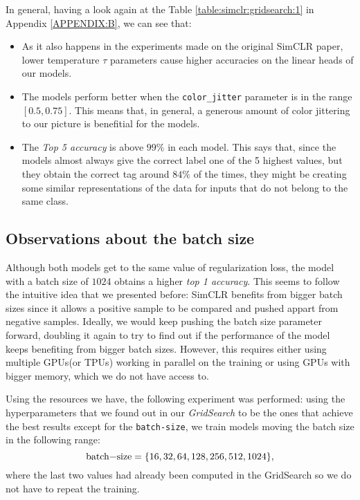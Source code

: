 In general, having a look again at the Table \ref{table:simclr:gridsearch:1} in Appendix \ref{APPENDIX:B},  we can see that:

\begin{itemize}
    \item As it also happens in the experiments made on the original SimCLR paper, lower temperature $\tau$ parameters cause higher accuracies on the linear heads of our models.
    
    \item The models perform better when the \lstinline{color_jitter} parameter is in the range $[0.5,0.75]$. This means that, in general, a generous amount of color jittering to our picture is benefitial for the models.

    \item The \emph{Top 5 accuracy} is above $99\%$ in each model. This says that, since the models almost always give the correct label one of the 5 highest values, but they obtain the correct tag around $84\%$ of the times, they might be creating some similar representations of the data for inputs that do not belong to the same class. 
\end{itemize}

\subsection*{Observations about the batch size}

Although both models get to the same value of regularization loss, the model with a batch size of $1024$ obtains a higher \emph{top 1 accuracy}. This seems to follow the intuitive idea that we presented before: SimCLR benefits from bigger batch sizes since it allows a positive sample to be compared and pushed appart from negative samples. Ideally, we would keep pushing the batch size parameter forward, doubling it again to try to find out if the performance of the model keeps benefiting from bigger batch sizes. However, this requires either using multiple GPUs(or TPUs) working in parallel on the training or using GPUs with bigger memory, which we do not have access to. 

Using the resources we have, the following experiment was performed: using the hyperparameters that we found out in our \emph{GridSearch} to be the ones that achieve the best results except for the \lstinline{batch-size}, we train models moving the batch size in the following range: 
$$
\text{\lstinline{batch-size}}=\{16,32,64,128,256,512,1024\},
$$
where the last two values had already been computed in the GridSearch so we do not have to repeat the training.

